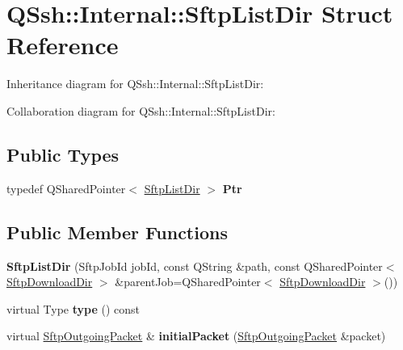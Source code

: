 \hypertarget{struct_q_ssh_1_1_internal_1_1_sftp_list_dir}{}\section{Q\+Ssh\+:\+:Internal\+:\+:Sftp\+List\+Dir Struct Reference}
\label{struct_q_ssh_1_1_internal_1_1_sftp_list_dir}


Inheritance diagram for Q\+Ssh\+:\+:Internal\+:\+:Sftp\+List\+Dir\+:


Collaboration diagram for Q\+Ssh\+:\+:Internal\+:\+:Sftp\+List\+Dir\+:
\subsection*{Public Types}
\begin{DoxyCompactItemize}
\item 
\mbox{\label{struct_q_ssh_1_1_internal_1_1_sftp_list_dir_a0ead16719e1493d821181b8725b87ce3}} 
typedef Q\+Shared\+Pointer$<$ \mbox{\hyperlink{struct_q_ssh_1_1_internal_1_1_sftp_list_dir}{Sftp\+List\+Dir}} $>$ {\bfseries Ptr}
\end{DoxyCompactItemize}
\subsection*{Public Member Functions}
\begin{DoxyCompactItemize}
\item 
\mbox{\label{struct_q_ssh_1_1_internal_1_1_sftp_list_dir_a20a492ecee6cdad3ef9691e4f8ce63de}} 
{\bfseries Sftp\+List\+Dir} (Sftp\+Job\+Id job\+Id, const Q\+String \&path, const Q\+Shared\+Pointer$<$ \mbox{\hyperlink{struct_q_ssh_1_1_internal_1_1_sftp_download_dir}{Sftp\+Download\+Dir}} $>$ \&parent\+Job=Q\+Shared\+Pointer$<$ \mbox{\hyperlink{struct_q_ssh_1_1_internal_1_1_sftp_download_dir}{Sftp\+Download\+Dir}} $>$())
\item 
\mbox{\label{struct_q_ssh_1_1_internal_1_1_sftp_list_dir_a39300eb1b4051a30506df1ac51190bc1}} 
virtual Type {\bfseries type} () const
\item 
\mbox{\label{struct_q_ssh_1_1_internal_1_1_sftp_list_dir_a80af6b85f3d59666b3d42754901b45e0}} 
virtual \mbox{\hyperlink{class_q_ssh_1_1_internal_1_1_sftp_outgoing_packet}{Sftp\+Outgoing\+Packet}} \& {\bfseries initial\+Packet} (\mbox{\hyperlink{class_q_ssh_1_1_internal_1_1_sftp_outgoing_packet}{Sftp\+Outgoing\+Packet}} \&packet)
\end{DoxyCompactItemize}
